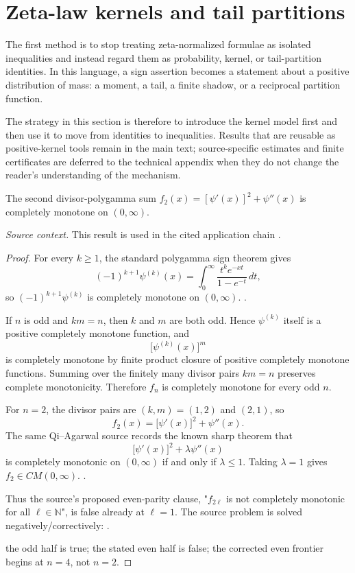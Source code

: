 \section{Zeta-law kernels and tail partitions}
The first method is to stop treating zeta-normalized formulae as isolated inequalities and instead regard them as probability, kernel, or tail-partition identities.  In this language, a sign assertion becomes a statement about a positive distribution of mass: a moment, a tail, a finite shadow, or a reciprocal partition function.

The strategy in this section is therefore to introduce the kernel model first and then use it to move from identities to inequalities.  Results that are reusable as positive-kernel tools remain in the main text; source-specific estimates and finite certificates are deferred to the technical appendix when they do not change the reader's understanding of the mechanism.
\begin{proposition}
\label{res:qa-divisor-polygamma-f2-cm}
The second divisor-polygamma sum \(f_2(x)=[\psi'(x)]^2+\psi''(x)\) is completely monotone on \((0,\infty)\).

\emph{Source context.} This result is used in the cited application chain \cite{app-app-0028-source}.
\end{proposition}
\begin{proof}
For every \(k\ge1\), the standard polygamma sign theorem gives
\[
(-1)^{k+1}\psi^{(k)}(x)
=
\int_0^\infty \frac{t^k e^{-xt}}{1-e^{-t}}\,dt,
\]
so \((-1)^{k+1}\psi^{(k)}\) is completely monotone on \((0,\infty)\). \cite{app-app-0028-source}.

If \(n\) is odd and \(km=n\), then \(k\) and \(m\) are both odd. Hence \(\psi^{(k)}\) itself is a positive completely monotone function, and
\[
\bigl[\psi^{(k)}(x)\bigr]^m
\]
is completely monotone by finite product closure of positive completely monotone functions. Summing over the finitely many divisor pairs \(km=n\) preserves complete monotonicity. Therefore \(f_n\) is completely monotone for every odd \(n\).

For \(n=2\), the divisor pairs are \((k,m)=(1,2)\) and \((2,1)\), so
\[
f_2(x)=\bigl[\psi'(x)\bigr]^2+\psi''(x).
\]
The same Qi--Agarwal source records the known sharp theorem that
\[
\bigl[\psi'(x)\bigr]^2+\lambda\psi''(x)
\]
is completely monotonic on \((0,\infty)\) if and only if \(\lambda\le1\). Taking \(\lambda=1\) gives \(f_2\in CM(0,\infty)\). \cite{app-app-0028-source}.

Thus the source's proposed even-parity clause, "\(f_{2\ell}\) is not completely monotonic for all \(\ell\in\mathbb N\)", is false already at \(\ell=1\). The source problem is solved negatively/correctively: \cite{app-app-0028-source}.

the odd half is true;
the stated even half is false;
the corrected even frontier begins at \(n=4\), not \(n=2\).
\end{proof}

